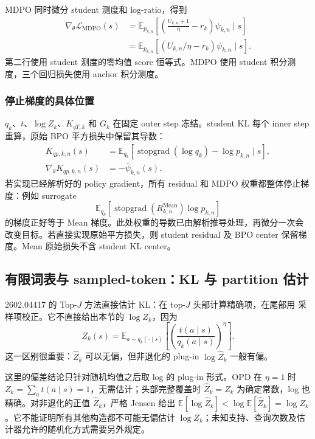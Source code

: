 \documentclass[lang=cn,scheme=chinese,openany]{../book/elegantbook}
\newcommand{\E}{\mathbb E}
\newcommand{\sg}{\operatorname{stopgrad}}
\begin{document}
MDPO 同时微分 student 测度和 log-ratio，得到
\begin{align}
\nabla_\theta\mathcal L_{\mathrm{MDPO}}(s)
&=\mathbb E_{p_{k,n}}\left[\left(\frac{U_{k,n}+1}\eta-r_k\right)\psi_{k,n}\mid s\right]\\
&=\mathbb E_{p_{k,n}}[(U_{k,n}/\eta-r_k)\psi_{k,n}\mid s].
\end{align}
第二行使用 student 测度的零均值 score 恒等式。MDPO 使用 student 积分测度，三个回归损失使用 anchor 积分测度。

\subsubsection*{停止梯度的具体位置}
$q_k$、$t$、$\log Z_k$、$K_{qT,k}$ 和 $G_k$ 在固定 outer step 冻结。student KL 每个 inner step 重算，原始 BPO 平方损失中保留其导数：
\begin{align}
K_{qp,k,n}(s)&=\mathbb E_{q_k}[\sg(\log q_k)-\log p_{k,n}\mid s],\\
\nabla_\theta K_{qp,k,n}(s)&=-\bar\psi_{k,n}(s).
\label{eq:ch2-opd-grad-ktheta}
\end{align}
若实现已经解析好的 policy gradient，所有 residual 和 MDPO 权重都整体停止梯度：例如 surrogate
\begin{equation}
\mathbb E_{q_k}[\sg(R_{k,n}^{\mathrm{Mean}})\log p_{k,n}]
\end{equation}
的梯度正好等于 Mean 梯度。此处权重的导数已由解析推导处理，再微分一次会改变目标。若直接实现原始平方损失，则 student residual 及 BPO center 保留梯度。Mean 原始损失不含 student KL center。



\subsection{有限词表与 sampled-token：KL 与 partition 估计}
\label{sec:ch2-opd-z-kl-estimation}

2602.04417 的 Top-$J$ 方法直接估计 KL：在 top-$J$ 头部计算精确项，在尾部用 采样项校正。它不直接给出本节的 $\log Z_k$，因为
\begin{equation}
Z_k(s)=\mathbb E_{a\sim q_k(\cdot\mid s)}
\left[\left(\frac{t(a\mid s)}{q_k(a\mid s)}\right)^\eta\right].
\label{eq:ch2-opd-z-importance}
\end{equation}
这一区别很重要：$\widehat Z_k$ 可以无偏，但非退化的 plug-in $\log\widehat Z_k$ 一般有偏。

这里的偏差结论只针对随机均值之后取 log 的 plug-in 形式。OPD 在 $\eta=1$ 时 $Z_k=\sum_a t(a\mid s)=1$，无需估计；头部完整覆盖时 $\widehat Z_k=Z_k$ 为确定常数，log 也精确。对非退化的正值 $\widehat Z_k$，严格 Jensen 给出 $\E[\log\widehat Z_k]<\log\E[\widehat Z_k]=\log Z_k$。它不能证明所有其他构造都不可能无偏估计 $\log Z_k$；未知支持、查询次数及估计器允许的随机化方式需要另外规定。
\end{document}
